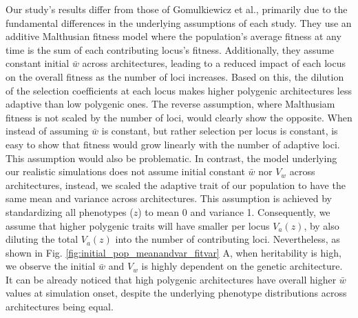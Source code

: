 \documentclass{article}
\begin{document}
Our study's results differ from those of Gomulkiewicz et al., primarily due to the fundamental differences in the underlying assumptions of each study. They use an additive Malthusian fitness model where the population's average fitness at any time is the sum of each contributing locus's fitness. Additionally, they assume constant initial $\bar{w}$ across architectures, leading to a reduced impact of each locus on the overall fitness as the number of loci increases. Based on this, the dilution of the selection coefficients at each locus makes higher polygenic architectures less adaptive than low polygenic ones. The reverse assumption, where Malthusiam fitness is not scaled by the number of loci, would clearly show the opposite. When instead of assuming $\bar{w}$ is constant, but rather selection per locus is constant, is easy to show that fitness would grow linearly with the number of adaptive loci. This assumption would also be problematic. In contrast, the model underlying our realistic simulations does not assume initial constant $\bar{w}$ nor $V_w$ across architectures, instead, we scaled the adaptive trait of our population to have the same mean and variance across architectures. This assumption is achieved by standardizing all phenotypes ($z$) to mean 0 and variance 1. Consequently, we assume that higher polygenic traits will have smaller per locus $V_a(z)$, by also diluting the total $V_a(z)$ into the number of contributing loci. Nevertheless, as shown in Fig. \ref{fig:initial_pop_meanandvar_fitvar} A, when heritability is high, we observe the initial $\bar{w}$ and $V_w$ is highly dependent on the genetic architecture. It can be already noticed that high polygenic architectures have overall higher $\bar{w}$ values at simulation onset, despite the underlying phenotype distributions across architectures being equal. 
\end{document}
